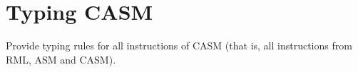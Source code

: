 \documentclass{article}
\begin{document}
\section{Typing CASM}
Provide typing rules for all instructions of CASM (that is, all instructions from RML, ASM and CASM).
\hline
% 
% 
% 
\end{document}
